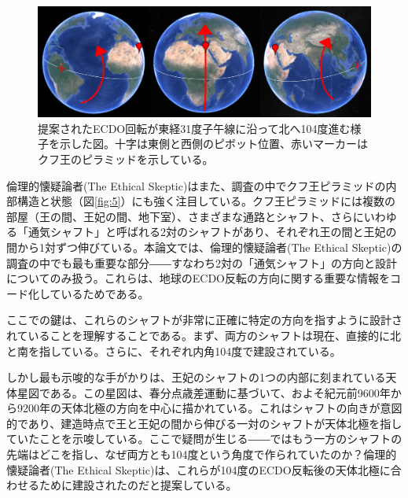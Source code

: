 \documentclass[10pt,twocolumn,letterpaper]{article}
\begin{document}
\begin{figure}[t]
\begin{center}
\includegraphics[width=1\textwidth]{drawing.jpg}
\end{center}
   \caption{提案されたECDO回転が東経31度子午線に沿って北へ104度進む様子を示した図。十字は東側と西側のピボット位置、赤いマーカーはクフ王のピラミッドを示している。}
\label{fig:6}
\end{figure}

倫理的懐疑論者(The Ethical Skeptic)はまた、調査の中でクフ王ピラミッドの内部構造と状態（図\ref{fig:5}）にも強く注目している\cite{28}。クフ王ピラミッドには複数の部屋（王の間、王妃の間、地下室）、さまざまな通路とシャフト、さらにいわゆる「通気シャフト」と呼ばれる2対のシャフトがあり、それぞれ王の間と王妃の間から1対ずつ伸びている\cite{29,30}。本論文では、倫理的懐疑論者(The Ethical Skeptic)の調査の中でも最も重要な部分――すなわち2対の「通気シャフト」の方向と設計についてのみ扱う。これらは、地球のECDO反転の方向に関する重要な情報をコード化しているためである。


ここでの鍵は、これらのシャフトが非常に正確に特定の方向を指すように設計されていることを理解することである。まず、両方のシャフトは現在、直接的に北と南を指している。さらに、それぞれ内角104度で建設されている。

しかし最も示唆的な手がかりは、王妃のシャフトの1つの内部に刻まれている天体星図である。この星図は、春分点歳差運動に基づいて、およそ紀元前9600年から9200年の天体北極の方向を中心に描かれている\cite{28}。これはシャフトの向きが意図的であり、建造時点で王と王妃の間から伸びる一対のシャフトが天体北極を指していたことを示唆している。ここで疑問が生じる――ではもう一方のシャフトの先端はどこを指し、なぜ両方とも104度という角度で作られていたのか？倫理的懐疑論者(The Ethical Skeptic)は、これらが104度のECDO反転後の天体北極に合わせるために建設されたのだと提案している。
\end{document}

